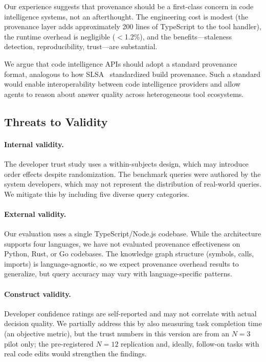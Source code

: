 \documentclass[conference]{IEEEtran}
\begin{document}
Our experience suggests that provenance should be a first-class concern
in code intelligence systems, not an afterthought. The engineering cost
is modest (the provenance layer adds approximately 200 lines of
TypeScript to the tool handler), the runtime overhead is negligible
($<$1.2\%), and the benefits---staleness detection, reproducibility,
trust---are substantial.

We argue that code intelligence APIs should adopt a standard provenance
format, analogous to how SLSA~\cite{SLSA2023} standardized build
provenance. Such a standard would enable interoperability between
code intelligence providers and allow agents to reason about answer
quality across heterogeneous tool ecosystems.

\subsection{Threats to Validity}
\label{sec:threats}

\paragraph{Internal validity.} The developer trust study uses a
within-subjects design, which may introduce order effects despite
randomization. The benchmark queries were authored by the system
developers, which may not represent the distribution of real-world
queries. We mitigate this by including five diverse query categories.

\paragraph{External validity.} Our evaluation uses a single
TypeScript/Node.js codebase. While the architecture supports four
languages, we have not evaluated provenance effectiveness on Python,
Rust, or Go codebases. The knowledge graph structure (symbols, calls,
imports) is language-agnostic, so we expect provenance overhead results
to generalize, but query accuracy may vary with language-specific
patterns.

\paragraph{Construct validity.} Developer confidence ratings are
self-reported and may not correlate with actual decision quality. We
partially address this by also measuring task completion time (an
objective metric), but the trust numbers in this version are from an
$N{=}3$ pilot only; the pre-registered $N{=}12$ replication and, ideally,
follow-on tasks with real code edits would strengthen the findings.
\end{document}
